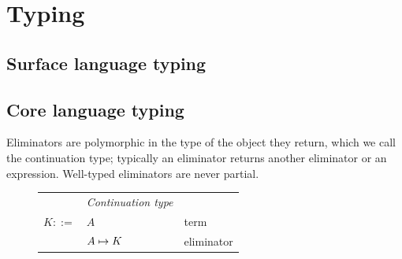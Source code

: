 \section{Typing}

\subsection{Surface language typing}





\subsection{Core language typing}

Eliminators are polymorphic in the type of the object they return, which we call the continuation type;
typically an eliminator returns another eliminator or an expression. Well-typed eliminators are
never partial.

\begin{figure}[H]
\begin{minipage}[t]{0.48\textwidth}
   \begin{tabularx}{\textwidth}{rL{2.6cm}L{3.6cm}}
      &\textit{Continuation type}&
      \\
      $K ::=$
      &
      $A$
      &
      term
      \\
      &
      ${A}\mapsto{K}$
      &
      eliminator
   \end{tabularx}
\end{minipage}
\end{figure}


